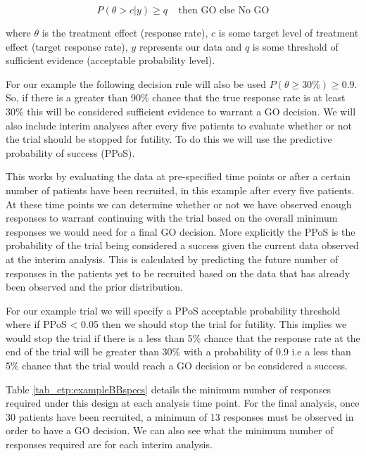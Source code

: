 \begin{equation}
	\label{eq_etp:betafinaldecrule}
	P(\theta > c |y) \geq q  \; \; \; \; \text{then GO else No GO}
\end{equation}

where $\theta$ is the treatment effect (response rate), $c$ is some target level of treatment effect (target response rate), $y$ represents our data and $q$ is some threshold of sufficient evidence (acceptable probability level). 
 
For our example the following decision rule will also be used $P(\theta  \geq 30\%) \geq 0.9$. So, if there is a greater than  90\% chance that the true response rate is at least 30\% this will be considered sufficient evidence to warrant a GO decision. We will also include interim analyses after every five patients to evaluate whether or not the trial should be stopped for futility. To do this we will use the predictive probability of success (PPoS).

This works by evaluating the data at pre-specified time points or after a certain number of patients have been recruited, in this example after every five patients. At these time points we can determine whether or not we have observed enough responses to warrant continuing with the trial based on the overall minimum responses we would need for a final GO decision. More explicitly the PPoS is the probability of the trial being considered a success given the current data observed at the interim analysis. This is calculated by predicting the future number of responses in the patients yet to be recruited based on the data that has already been observed and the prior distribution.

For our example trial we will specify a PPoS acceptable probability threshold where if PPoS < 0.05 then we should stop the trial for futility. This implies we would stop the trial if there is a less than 5\% chance that the response rate at the end of the trial will be greater than 30\% with a probability of 0.9 i.e a less than 5\% chance that the trial would reach a GO decision or be considered a success. 

Table \ref{tab_etp:exampleBBspecs} details the minimum number of responses required under this design at each analysis time point. For the final analysis, once 30 patients have been recruited, a minimum of 13 responses must be observed in order to have a GO decision. We can also see what the minimum number of responses required are for each interim analysis.

